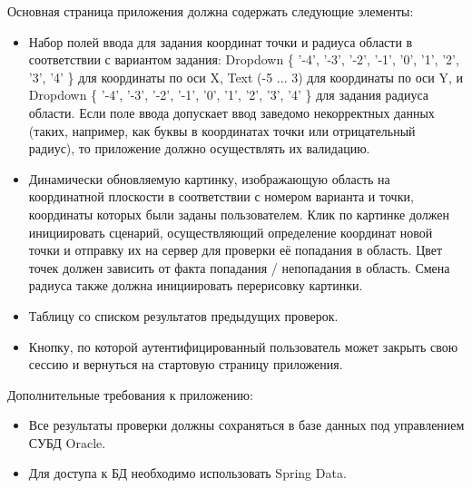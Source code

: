 Основная страница приложения должна содержать следующие элементы:
\begin{itemize}
\item Набор полей ввода для задания координат точки и радиуса области в соответствии с вариантом задания: Dropdown \{ '-4', '-3', '-2', '-1', '0', '1', '2', '3', '4' \} для координаты по оси X, Text (-5 ... 3) для координаты по оси Y, и Dropdown \{ '-4', '-3', '-2', '-1', '0', '1', '2', '3', '4' \} для задания радиуса области. Если поле ввода допускает ввод заведомо некорректных данных (таких, например, как буквы в координатах точки или отрицательный радиус), то приложение должно осуществлять их валидацию.
\item Динамически обновляемую картинку, изображающую область на координатной плоскости в соответствии с номером варианта и точки, координаты которых были заданы пользователем. Клик по картинке должен инициировать сценарий, осуществляющий определение координат новой точки и отправку их на сервер для проверки её попадания в область. Цвет точек должен зависить от факта попадания / непопадания в область. Смена радиуса также должна инициировать перерисовку картинки.
\item Таблицу со списком результатов предыдущих проверок.
\item Кнопку, по которой аутентифицированный пользователь может закрыть свою сессию и вернуться на стартовую страницу приложения.
\end{itemize}

Дополнительные требования к приложению:
\begin{itemize}
\item Все результаты проверки должны сохраняться в базе данных под управлением СУБД Oracle.
\item Для доступа к БД необходимо использовать Spring Data.
\end{itemize}